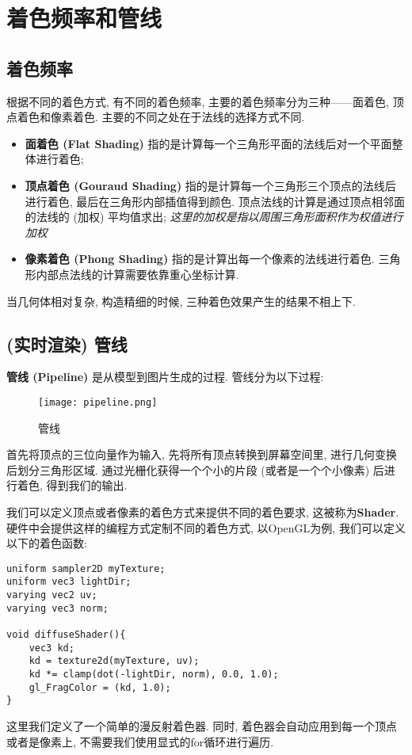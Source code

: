 \chapter{着色频率和管线}

\section{着色频率}
根据不同的着色方式, 有不同的着色频率, 主要的着色频率分为三种——面着色, 顶点着色和像素着色. 主要的不同之处在于法线的选择方式不同. 

\begin{itemize}
	\item \textbf{面着色 (Flat Shading) }指的是计算每一个三角形平面的法线后对一个平面整体进行着色; 
	\item \textbf{顶点着色 (Gouraud Shading) }指的是计算每一个三角形三个顶点的法线后进行着色, 最后在三角形内部插值得到颜色. 顶点法线的计算是通过顶点相邻面的法线的 (加权) 平均值求出; \textit{这里的加权是指以周围三角形面积作为权值进行加权}
	\item \textbf{像素着色 (Phong Shading) }指的是计算出每一个像素的法线进行着色. 三角形内部点法线的计算需要依靠重心坐标计算. 
\end{itemize}
当几何体相对复杂, 构造精细的时候, 三种着色效果产生的结果不相上下. 

\section{ (实时渲染) 管线}
\textbf{管线 (Pipeline) }是从模型到图片生成的过程. 管线分为以下过程: 
\begin{figure}[H]
	\centering
	\texttt{[image: pipeline.png]}
	\caption{管线}
	\label{fig:pipeline}
\end{figure}

首先将顶点的三位向量作为输入, 先将所有顶点转换到屏幕空间里, 进行几何变换后划分三角形区域. 通过光栅化获得一个个小的片段 (或者是一个个小像素) 后进行着色, 得到我们的输出. 

我们可以定义顶点或者像素的着色方式来提供不同的着色要求, 这被称为\textbf{Shader}. 硬件中会提供这样的编程方式定制不同的着色方式, 以OpenGL为例, 我们可以定义以下的着色函数: 
\begin{lstlisting}
uniform sampler2D myTexture;
uniform vec3 lightDir;
varying vec2 uv;
varying vec3 norm;

void diffuseShader(){
	vec3 kd;
	kd = texture2d(myTexture, uv);
	kd *= clamp(dot(-lightDir, norm), 0.0, 1.0);
	gl_FragColor = (kd, 1.0);
}
\end{lstlisting}
这里我们定义了一个简单的漫反射着色器. 同时, 着色器会自动应用到每一个顶点或者是像素上, 不需要我们使用显式的for循环进行遍历. 

